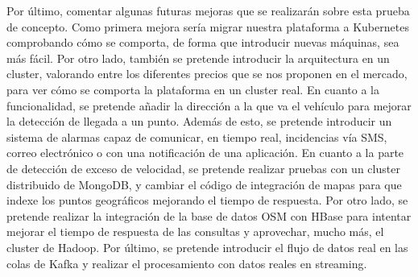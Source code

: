 Por último, comentar algunas futuras mejoras que se realizarán sobre esta
prueba de concepto. Como primera mejora sería migrar nuestra plataforma a
Kubernetes comprobando cómo se comporta, de forma que introducir nuevas
máquinas, sea más fácil. Por otro lado, también se pretende introducir la
arquitectura en un cluster, valorando entre los diferentes precios que se
nos proponen en el mercado, para ver cómo se comporta la plataforma en un
cluster real. En cuanto a la funcionalidad, se pretende añadir la dirección
a la que va el vehículo para mejorar la detección de llegada a un punto.
Además de esto, se pretende introducir un sistema de alarmas capaz de
comunicar, en tiempo real, incidencias vía SMS, correo electrónico o con
una notificación de una aplicación. En cuanto a la parte de detección de
exceso de velocidad, se pretende realizar pruebas con un cluster
distribuido de MongoDB, y cambiar el código de integración de mapas para
que indexe los puntos geográficos mejorando el tiempo de respuesta. Por
otro lado, se pretende realizar la integración de la base de datos OSM
con HBase para intentar mejorar el tiempo de respuesta de las consultas
y aprovechar, mucho más, el cluster de Hadoop\cite{MapReducePatterns}. Por
último, se pretende introducir el flujo de datos real en las colas de 
Kafka y realizar el procesamiento con datos reales en streaming.

